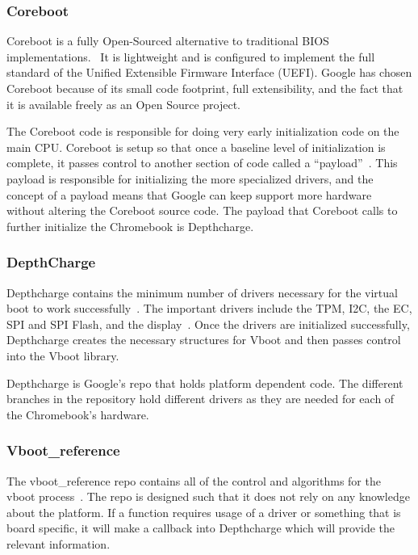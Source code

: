 \documentclass[../report.tex]{subfiles}
\begin{document}
\subsubsection{Coreboot}\label{coreboot}

Coreboot is a fully Open-Sourced alternative to traditional BIOS implementations.~\cite{coreboot}
It is lightweight and is configured to implement the full standard of the Unified Extensible Firmware Interface (UEFI).
Google has chosen Coreboot because of its small code footprint, full extensibility, and the fact that it is available freely as an Open Source project.

The Coreboot code is responsible for doing very early initialization code on the main CPU\@. 
Coreboot is setup so that once a baseline level of initialization is complete, it passes control to another section of code called a ``payload''~\cite{coreboot-payload}.
This payload is responsible for initializing the more specialized drivers, and the concept of a payload means that Google can keep support more hardware without altering the Coreboot source code.
The payload that Coreboot calls to further initialize the Chromebook is Depthcharge.


\subsubsection{DepthCharge}

Depthcharge contains the minimum number of drivers necessary for the virtual boot to work successfully~\cite{depthcharge-codebase}. 
The important drivers include the TPM, I2C, the EC, SPI and SPI Flash, and the display~\cite{depthcharge-slides}.
Once the drivers are initialized successfully, Depthcharge creates the necessary structures for Vboot and then passes control into the Vboot library.

Depthcharge is Google's repo that holds platform dependent code.
The different branches in the repository hold different drivers as they are needed for each of the Chromebook's hardware.

\subsubsection{Vboot\_reference}

The vboot\_reference repo contains all of the control and algorithms for the vboot process~\cite{vboot-codebase}.
The repo is designed such that it does not rely on any knowledge about the platform.
If a function requires usage of a driver or something that is board specific, it will make a callback into Depthcharge which will provide the relevant information.
\end{document}
